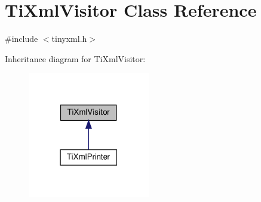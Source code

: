 \hypertarget{classTiXmlVisitor}{}\section{Ti\+Xml\+Visitor Class Reference}
\label{classTiXmlVisitor}


{\ttfamily \#include $<$tinyxml.\+h$>$}



Inheritance diagram for Ti\+Xml\+Visitor\+:
\nopagebreak
\begin{figure}[H]
\begin{center}
\leavevmode
\includegraphics[width=151pt]{classTiXmlVisitor__inherit__graph}
\end{center}
\end{figure}

